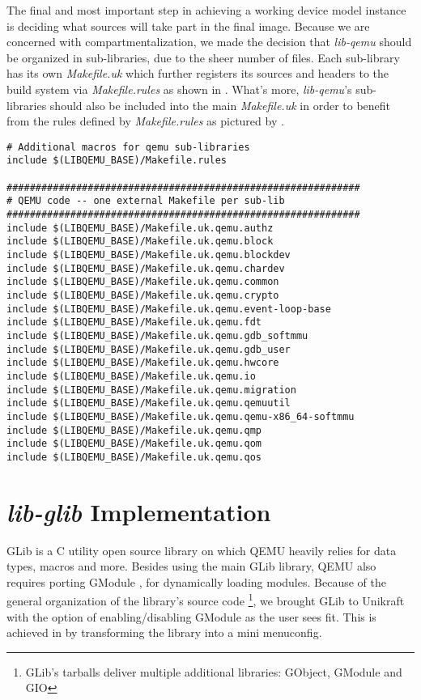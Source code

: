 The final and most important step in achieving a working device model instance is deciding what sources will take part in the final image.
Because we are concerned with compartmentalization, we made the decision that \textit{lib-qemu} should be organized in sub-libraries, due to the sheer number of files.
Each sub-library has its own \textit{Makefile.uk} which further registers its sources and headers to the build system via \textit{Makefile.rules} as shown in .
What's more, \textit{lib-qemu}'s sub-libraries should also be included into the main \textit{Makefile.uk} in order to benefit from the rules defined by \textit{Makefile.rules} as pictured by .

\begin{lstlisting}
# Additional macros for qemu sub-libraries
include $(LIBQEMU_BASE)/Makefile.rules

#############################################################
# QEMU code -- one external Makefile per sub-lib
#############################################################
include $(LIBQEMU_BASE)/Makefile.uk.qemu.authz
include $(LIBQEMU_BASE)/Makefile.uk.qemu.block
include $(LIBQEMU_BASE)/Makefile.uk.qemu.blockdev
include $(LIBQEMU_BASE)/Makefile.uk.qemu.chardev
include $(LIBQEMU_BASE)/Makefile.uk.qemu.common
include $(LIBQEMU_BASE)/Makefile.uk.qemu.crypto
include $(LIBQEMU_BASE)/Makefile.uk.qemu.event-loop-base
include $(LIBQEMU_BASE)/Makefile.uk.qemu.fdt
include $(LIBQEMU_BASE)/Makefile.uk.qemu.gdb_softmmu
include $(LIBQEMU_BASE)/Makefile.uk.qemu.gdb_user
include $(LIBQEMU_BASE)/Makefile.uk.qemu.hwcore
include $(LIBQEMU_BASE)/Makefile.uk.qemu.io
include $(LIBQEMU_BASE)/Makefile.uk.qemu.migration
include $(LIBQEMU_BASE)/Makefile.uk.qemu.qemuutil
include $(LIBQEMU_BASE)/Makefile.uk.qemu.qemu-x86_64-softmmu
include $(LIBQEMU_BASE)/Makefile.uk.qemu.qmp
include $(LIBQEMU_BASE)/Makefile.uk.qemu.qom
include $(LIBQEMU_BASE)/Makefile.uk.qemu.qos
\end{lstlisting}

\section{\textit{lib-glib} Implementation}
\label{sec:impl-lib-glib}

GLib \cite{glib} is a C utility open source library on which QEMU heavily relies for data types, macros and more.
Besides using the main GLib library, QEMU also requires porting GModule \cite{gmodule}, for dynamically loading modules.
Because of the general organization of the library's source code \footnote{GLib's tarballs deliver multiple additional libraries: GObject, GModule and GIO}, we brought GLib to Unikraft with the option of enabling/disabling GModule as the user sees fit.
This is achieved in  by transforming the library into a mini menuconfig.


